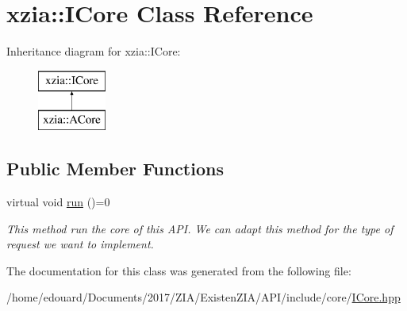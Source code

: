 \hypertarget{classxzia_1_1ICore}{}\section{xzia\+:\+:I\+Core Class Reference}
\label{classxzia_1_1ICore}
Inheritance diagram for xzia\+:\+:I\+Core\+:\begin{figure}[H]
\begin{center}
\leavevmode
\includegraphics[height=2.000000cm]{classxzia_1_1ICore}
\end{center}
\end{figure}
\subsection*{Public Member Functions}
\begin{DoxyCompactItemize}
\item 
\mbox{\label{classxzia_1_1ICore_a892d1d93609f5f4ea0c788f74cc9d81d}} 
virtual void \mbox{\hyperlink{classxzia_1_1ICore_a892d1d93609f5f4ea0c788f74cc9d81d}{run}} ()=0
\begin{DoxyCompactList}\small\item\em This method run the core of this A\+PI. We can adapt this method for the type of request we want to implement. \end{DoxyCompactList}\end{DoxyCompactItemize}


The documentation for this class was generated from the following file\+:\begin{DoxyCompactItemize}
\item 
/home/edouard/\+Documents/2017/\+Z\+I\+A/\+Existen\+Z\+I\+A/\+A\+P\+I/include/core/\mbox{\hyperlink{ICore_8hpp}{I\+Core.\+hpp}}\end{DoxyCompactItemize}
